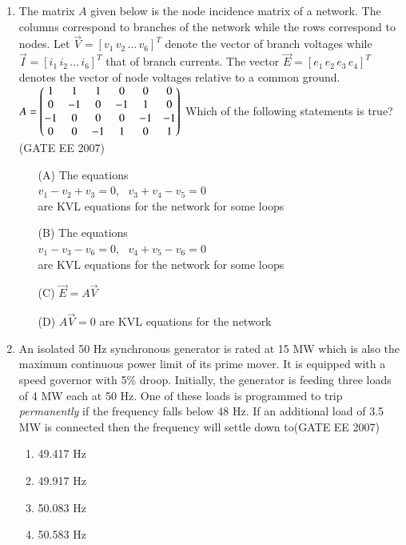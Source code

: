 \documentclass[a4paper,10pt]{exam}
\theoremstyle{remark}
\begin{document}
\begin{enumerate}
\vspace{1em}
\item  
The matrix $A$ given below is the node incidence matrix of a network. The columns correspond to branches of the network while the rows correspond to nodes. Let $\vec{V} = [v_1\, v_2\, \ldots\, v_6]^T$ denote the vector of branch voltages while $\vec{I} = [i_1\, i_2\, \ldots\, i_6]^T$ that of branch currents. The vector $\vec{E} = [e_1\, e_2\, e_3\, e_4]^T$ denotes the vector of node voltages relative to a common ground.
$
A =
\begin{pmatrix}
1 & 1 & 1 & 0 & 0 & 0 \\
0 & -1 & 0 & -1 & 1 & 0 \\
-1 & 0 & 0 & 0 & -1 & -1 \\
0 & 0 & -1 & 1 & 0 & 1 \\
\end{pmatrix}
$
Which of the following statements is true?\hfill{(GATE EE 2007)}
\begin{enumerate}
    \item[(A)] The equations\\
        \hspace*{1.5em}$v_1 - v_2 + v_3 = 0$, \ $v_3 + v_4 - v_5 = 0$\\
        are KVL equations for the network for some loops
    \item[(B)] The equations\\
        \hspace*{1.5em}$v_1 - v_3 - v_6 = 0$, \ $v_4 + v_5 - v_6 = 0$\\
        are KVL equations for the network for some loops
    \item[(C)] $\vec{E} = A\vec{V}$
    \item[(D)] $A\vec{V} = 0$ are KVL equations for the network
\end{enumerate}

\vfill
{}
\newpage

\item  
An isolated 50 Hz synchronous generator is rated at 15 MW which is also the maximum continuous power limit of its prime mover. It is equipped with a speed governor with 5\% droop. Initially, the generator is feeding three loads of 4 MW each at 50 Hz. One of these loads is programmed to trip \textit{permanently} if the frequency falls below 48 Hz. If an additional load of 3.5 MW is connected then the frequency will settle down to\hfill{(GATE EE 2007)}

\begin{multicols}{4}
\begin{enumerate}
\item  49.417 Hz
\item  49.917 Hz
\item  50.083 Hz
\item  50.583 Hz
\end{enumerate}
\end{multicols}


\end{enumerate}
\end{document}
